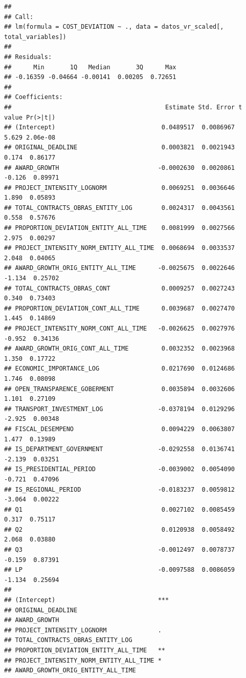 \documentclass[
]{article}
\begin{document}
\begin{verbatim}
## 
## Call:
## lm(formula = COST_DEVIATION ~ ., data = datos_vr_scaled[, total_variables])
## 
## Residuals:
##      Min       1Q   Median       3Q      Max 
## -0.16359 -0.04664 -0.00141  0.00205  0.72651 
## 
## Coefficients:
##                                          Estimate Std. Error t value Pr(>|t|)
## (Intercept)                             0.0489517  0.0086967   5.629 2.06e-08
## ORIGINAL_DEADLINE                       0.0003821  0.0021943   0.174  0.86177
## AWARD_GROWTH                           -0.0002630  0.0020861  -0.126  0.89971
## PROJECT_INTENSITY_LOGNORM               0.0069251  0.0036646   1.890  0.05893
## TOTAL_CONTRACTS_OBRAS_ENTITY_LOG        0.0024317  0.0043561   0.558  0.57676
## PROPORTION_DEVIATION_ENTITY_ALL_TIME    0.0081999  0.0027566   2.975  0.00297
## PROJECT_INTENSITY_NORM_ENTITY_ALL_TIME  0.0068694  0.0033537   2.048  0.04065
## AWARD_GROWTH_ORIG_ENTITY_ALL_TIME      -0.0025675  0.0022646  -1.134  0.25702
## TOTAL_CONTRACTS_OBRAS_CONT              0.0009257  0.0027243   0.340  0.73403
## PROPORTION_DEVIATION_CONT_ALL_TIME      0.0039687  0.0027470   1.445  0.14869
## PROJECT_INTENSITY_NORM_CONT_ALL_TIME   -0.0026625  0.0027976  -0.952  0.34136
## AWARD_GROWTH_ORIG_CONT_ALL_TIME         0.0032352  0.0023968   1.350  0.17722
## ECONOMIC_IMPORTANCE_LOG                 0.0217690  0.0124686   1.746  0.08098
## OPEN_TRANSPARENCE_GOBERMENT             0.0035894  0.0032606   1.101  0.27109
## TRANSPORT_INVESTMENT_LOG               -0.0378194  0.0129296  -2.925  0.00348
## FISCAL_DESEMPENO                        0.0094229  0.0063807   1.477  0.13989
## IS_DEPARTMENT_GOVERNMENT               -0.0292558  0.0136741  -2.139  0.03251
## IS_PRESIDENTIAL_PERIOD                 -0.0039002  0.0054090  -0.721  0.47096
## IS_REGIONAL_PERIOD                     -0.0183237  0.0059812  -3.064  0.00222
## Q1                                      0.0027102  0.0085459   0.317  0.75117
## Q2                                      0.0120938  0.0058492   2.068  0.03880
## Q3                                     -0.0012497  0.0078737  -0.159  0.87391
## LP                                     -0.0097588  0.0086059  -1.134  0.25694
##                                           
## (Intercept)                            ***
## ORIGINAL_DEADLINE                         
## AWARD_GROWTH                              
## PROJECT_INTENSITY_LOGNORM              .  
## TOTAL_CONTRACTS_OBRAS_ENTITY_LOG          
## PROPORTION_DEVIATION_ENTITY_ALL_TIME   ** 
## PROJECT_INTENSITY_NORM_ENTITY_ALL_TIME *  
## AWARD_GROWTH_ORIG_ENTITY_ALL_TIME         

\end{verbatim}
\end{document}
